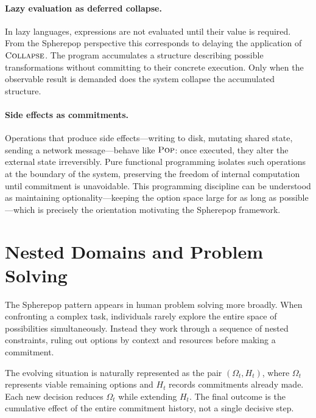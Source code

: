 \documentclass[12pt]{article}
\newcommand{\Pop}{\operatorname{\textsc{Pop}}}
\newcommand{\Collapse}{\operatorname{\textsc{Collapse}}}
\newcommand{\Option}{\Omega}
\begin{document}
\paragraph{Lazy evaluation as deferred collapse.} In lazy languages, expressions are not evaluated until their value is required. From the Spherepop perspective this corresponds to delaying the application of $\Collapse$. The program accumulates a structure describing possible transformations without committing to their concrete execution. Only when the observable result is demanded does the system collapse the accumulated structure.

\paragraph{Side effects as commitments.} Operations that produce side effects---writing to disk, mutating shared state, sending a network message---behave like $\Pop$: once executed, they alter the external state irreversibly. Pure functional programming isolates such operations at the boundary of the system, preserving the freedom of internal computation until commitment is unavoidable. This programming discipline can be understood as maintaining optionality---keeping the option space large for as long as possible---which is precisely the orientation motivating the Spherepop framework.

\section{Nested Domains and Problem Solving}
\label{sec:problemsolving}

The Spherepop pattern appears in human problem solving more broadly. When confronting a complex task, individuals rarely explore the entire space of possibilities simultaneously. Instead they work through a sequence of nested constraints, ruling out options by context and resources before making a commitment.

The evolving situation is naturally represented as the pair $(\Option_t, H_t)$, where $\Option_t$ represents viable remaining options and $H_t$ records commitments already made. Each new decision reduces $\Option_t$ while extending $H_t$. The final outcome is the cumulative effect of the entire commitment history, not a single decisive step.

\end{document}
